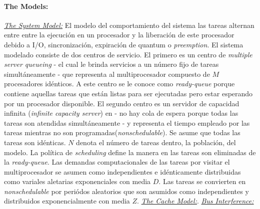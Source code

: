 \paragraph{\textnormal{\textbf{The Models:}}}
\underline{\textit{The System Model:}} El modelo del comportamiento del sistema las tareas alternan entre entre la ejecución en un procesador y la liberación de este procesador debido a I/O, sincronización, expiración de quantum o \textit{preemption}. El sistema modelado consiste de dos centros de servicio. El primero es un centro de \textit{multiple server queueing} - el cual le brinda servicios a un número fijo de tareas simultáneamente - que representa al multiprocesador compuesto de $M$ procesadores idénticos. A este centro se le conoce como \textit{ready-queue} porque contiene aquellas tareas que están listas para ser ejecutadas pero estar esperando por un procesador disponible. El segundo centro es un servidor de capacidad infinita (\textit{infinite capacity server}) en - no hay cola de espera porque todas las tareas son atendidas simultáneamente - y representa el tiempo empleado por las tareas mientras no son programadas(\textit{nonschedulable}). Se asume que todas las tareas son idénticas. $N$ denota el número de tareas dentro, la población, del modelo. La política de \textit{scheduling} define la manera en las tareas son eliminadas de la \textit{ready-queue}. Las demandas computacionales de las tareas por visitar el multiprocesador se asumen como independientes e idénticamente distribuidas como variales aletarias exponenciales con media $D$. Las tareas se convierten en \textit{nonschedulable} por periódos aleatorios que son asumidos como independientes y distribuidos exponencialmente con media $Z$. \underline{\textit{The Cache Model:}}. \underline{\textit{Bus Interference:}} 

